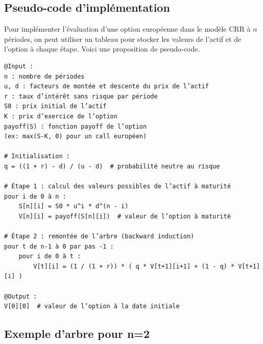 \documentclass[12pt,a4paper]{article}
\begin{document}
\subsection{Pseudo-code d'implémentation}
Pour implémenter l'évaluation d'une option européenne dans le modèle CRR à $n$ périodes, on peut utiliser un tableau pour stocker les valeurs de l'actif et de l'option à chaque étape. Voici une proposition de pseudo-code.
\begingroup\small
\begin{verbatim}
@Input :
n : nombre de périodes
u, d : facteurs de montée et descente du prix de l’actif
r : taux d’intérêt sans risque par période
S0 : prix initial de l’actif
K : prix d’exercice de l’option
payoff(S) : fonction payoff de l’option
(ex: max(S-K, 0) pour un call européen)

# Initialisation :
q = ((1 + r) - d) / (u - d)  # probabilité neutre au risque

# Étape 1 : calcul des valeurs possibles de l’actif à maturité
pour i de 0 à n :
    S[n][i] = S0 * u^i * d^(n - i)
    V[n][i] = payoff(S[n][i])  # valeur de l’option à maturité

# Étape 2 : remontée de l’arbre (backward induction)
pour t de n-1 à 0 par pas -1 :
    pour i de 0 à t :
        V[t][i] = (1 / (1 + r)) * ( q * V[t+1][i+1] + (1 - q) * V[t+1][i] )

@Output :
V[0][0]  # valeur de l’option à la date initiale
\end{verbatim}
\endgroup

\subsection{Exemple d'arbre pour n=2}
\begin{center}
\end{center}
\end{document}
